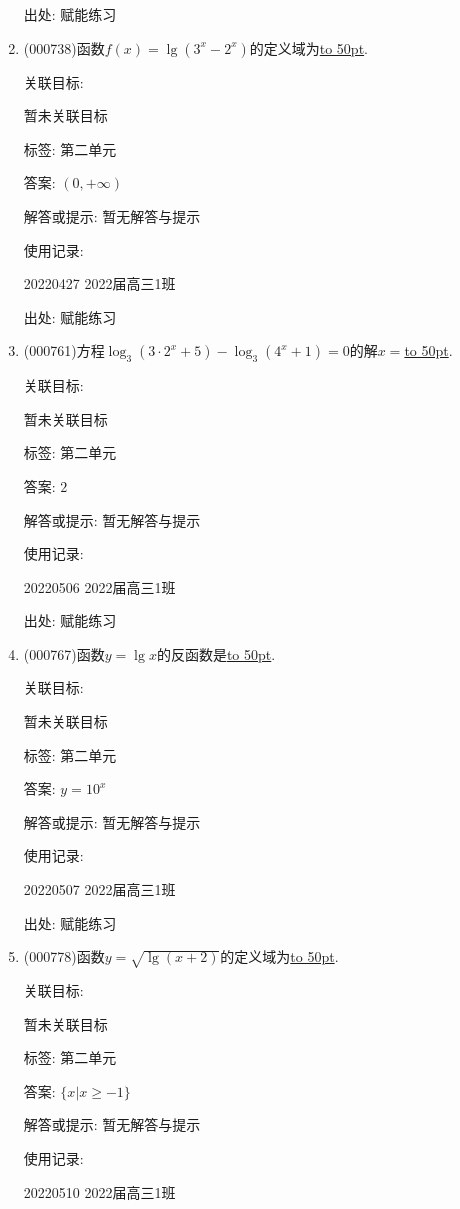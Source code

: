 \documentclass[10pt,a4paper]{article}
\newcommand{\blank}[1]{\underline{\hbox to #1pt{}}}
\begin{document}
\begin{enumerate}[1.]
出处: 赋能练习
\item { (000738)}函数$f(x)=\lg (3^x-2^x)$的定义域为\blank{50}.


关联目标:

暂未关联目标



标签: 第二单元

答案: $(0,+\infty)$

解答或提示: 暂无解答与提示

使用记录:

20220427	2022届高三1班	


出处: 赋能练习
\item { (000761)}方程$\log_3(3 \cdot 2^x+5)-\log_3(4^x+1)=0$的解$x=$\blank{50}.


关联目标:

暂未关联目标



标签: 第二单元

答案: $2$

解答或提示: 暂无解答与提示

使用记录:

20220506	2022届高三1班	


出处: 赋能练习
\item { (000767)}函数$y=\lg x$的反函数是\blank{50}.


关联目标:

暂未关联目标



标签: 第二单元

答案: $y=10^x$

解答或提示: 暂无解答与提示

使用记录:

20220507	2022届高三1班	


出处: 赋能练习
\item { (000778)}函数$y=\sqrt{\lg(x+2)}$的定义域为\blank{50}.


关联目标:

暂未关联目标



标签: 第二单元

答案: $\{x|x\ge -1\}$

解答或提示: 暂无解答与提示

使用记录:

20220510	2022届高三1班	



\end{enumerate}
\end{document}
